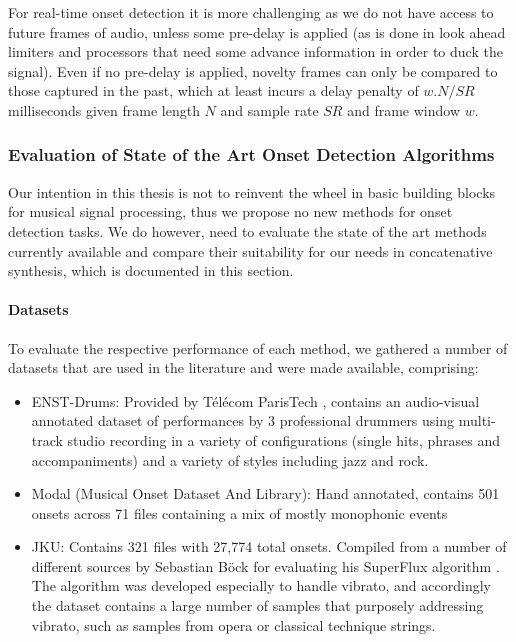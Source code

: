 For real-time onset detection it is more challenging as we do not have access to future frames of audio, unless some pre-delay is applied (as is done in look ahead limiters and processors that need some advance information in order to duck the signal). Even if no pre-delay is applied, novelty frames can only be compared to those captured in the past, which at least incurs a delay penalty of $w.N/SR$ milliseconds given frame length $N$ and sample rate $SR$ and frame window $w$.

\subsubsection{Evaluation of State of the Art Onset Detection Algorithms}

Our intention in this thesis is not to reinvent the wheel in basic building blocks for  musical signal processing, thus we propose no new methods for onset detection tasks. We do however, need to evaluate the state of the art methods currently available and compare their suitability for our needs in concatenative synthesis, which is documented in this section.

\paragraph{Datasets}

To evaluate the respective performance of each method, we gathered a number of datasets that are used in the literature and were made available, comprising:

\begin{itemize}
  \item ENST-Drums: Provided by Télécom ParisTech \citep{Gillet2006}, contains an audio-visual annotated dataset of performances by 3 professional drummers using multi-track studio recording in a variety of configurations (single hits, phrases and accompaniments) and a variety of styles including jazz and rock. 
  \item Modal (Musical Onset Dataset And Library): Hand annotated, contains 501 onsets across 71 files containing a mix of mostly monophonic events \citep{Glover2011}
  \item JKU: Contains 321 files with 27,774 total onsets. Compiled from a number of different sources by Sebastian Böck for evaluating his SuperFlux algorithm \citep{Bock2013}. The algorithm was developed especially to handle vibrato, and accordingly the dataset contains a large number of samples that purposely addressing vibrato, such as samples from opera or classical technique strings.
\end{itemize}

